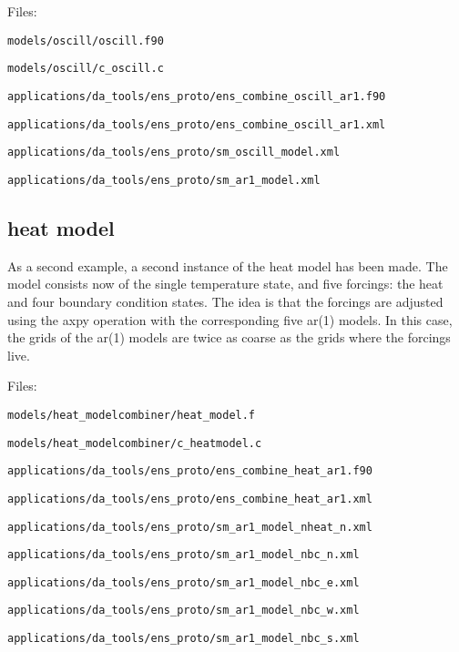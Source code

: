 \documentclass[a4paper,12pt]{article}
\begin{document}
Files:

{\tt models\slash oscill\slash oscill.f90}

{\tt models\slash oscill\slash c\_oscill.c}

{\tt applications\slash da\_tools\slash ens\_proto\slash ens\_combine\_oscill\_ar1.f90}

{\tt applications\slash da\_tools\slash ens\_proto\slash ens\_combine\_oscill\_ar1.xml}

{\tt applications\slash da\_tools\slash ens\_proto\slash sm\_oscill\_model.xml}

{\tt applications\slash da\_tools\slash ens\_proto\slash sm\_ar1\_model.xml}


\subsection{heat model}
As a second example, a second instance of the heat model has been made.
The model consists now of the single temperature state, and five forcings:
the heat and four boundary  condition states. The idea is that the forcings are
adjusted using the axpy operation with the corresponding five ar(1) models. In
this case, the grids of the ar(1) models are twice as coarse as the grids where
the forcings live.

Files:

{\tt models\slash heat\_modelcombiner\slash heat\_model.f}

{\tt models\slash heat\_modelcombiner\slash c\_heatmodel.c}

{\tt applications\slash da\_tools\slash ens\_proto\slash ens\_combine\_heat\_ar1.f90}

{\tt applications\slash da\_tools\slash ens\_proto\slash ens\_combine\_heat\_ar1.xml}

{\tt applications\slash da\_tools\slash ens\_proto\slash sm\_ar1\_model\_nheat\_n.xml}

{\tt applications\slash da\_tools\slash ens\_proto\slash sm\_ar1\_model\_nbc\_n.xml}

{\tt applications\slash da\_tools\slash ens\_proto\slash sm\_ar1\_model\_nbc\_e.xml}

{\tt applications\slash da\_tools\slash ens\_proto\slash sm\_ar1\_model\_nbc\_w.xml}

{\tt applications\slash da\_tools\slash ens\_proto\slash sm\_ar1\_model\_nbc\_s.xml}
\end{document}
